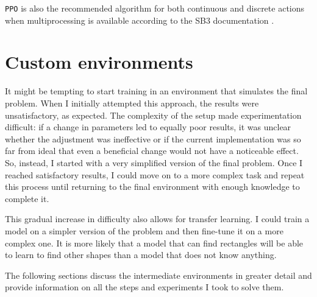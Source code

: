 \documentclass[
  digital,     %
  oneside,     %
  nosansbold,  %
  nocolorbold, %
  lof,         %
  lot,         %
]{fithesis4}
\begin{document}
\texttt{PPO} is also the recommended algorithm for both continuous and discrete actions when multiprocessing is available according to the SB3 documentation \cite{SB3-docs}.

\section{Custom environments}
It might be tempting to start training in an environment that simulates the final problem. When I initially attempted this approach, the results were unsatisfactory, as expected. The complexity of the setup made experimentation difficult: if a change in parameters led to equally poor results, it was unclear whether the adjustment was ineffective or if the current implementation was so far from ideal that even a beneficial change would not have a noticeable effect. So, instead, I started with a very simplified version of the final problem. Once I reached satisfactory results, I could move on to a more complex task and repeat this process until returning to the final environment with enough knowledge to complete it.

This gradual increase in difficulty also allows for transfer learning. I could train a model on a simpler version of the problem and then fine-tune it on a more complex one. It is more likely that a model that can find rectangles will be able to learn to find other shapes than a model that does not know anything.

The following sections discuss the intermediate environments in greater detail and provide information on all the steps and experiments I took to solve them.
\end{document}
